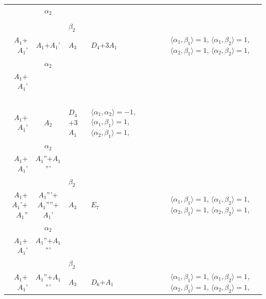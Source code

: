 \documentclass[12pt]{report}
\begin{document}
\begin{appendix}
{\begin{longtable}{rcl p{1cm}p{1cm}p{3cm} }
\\
\begin{tabular}{cc}$\alpha_1$+ & $\alpha_2$\\\tiny{  } & \tiny{  }\end{tabular} &\begin{tabular}{c} = \\~ \end{tabular} & \begin{tabular}{cc}$\beta_1$+ & $\beta_2$\\\tiny{ $A_1$+$A_1$' } & \tiny{ $A_1$+$A_1$' }\end{tabular} & $A_3$ & $D_4$+3$A_1$ &  $\langle\alpha_1, \beta_1\rangle=1$, $\langle\alpha_1, \beta_2\rangle=1$, $\langle\alpha_2, \beta_1\rangle=1$, $\langle\alpha_2, \beta_2\rangle=1$, 
\\
\begin{tabular}{cc}$\alpha_1$+ & $\alpha_2$\\\tiny{ $A_1$+$A_1$' } & \tiny{  }\end{tabular} &\begin{tabular}{c} = \\~ \end{tabular} & \begin{tabular}{c}$\beta_1$\\\tiny{ $A_1$+$A_1$' }\end{tabular} & $A_2$ & $D_4$+3$A_1$ & $\langle\alpha_1, \alpha_2\rangle=-1$,  $\langle\alpha_1, \beta_1\rangle=1$, $\langle\alpha_2, \beta_1\rangle=1$, 
\\
\begin{tabular}{cc}$\alpha_1$+ & $\alpha_2$\\\tiny{ $A_1$+$A_1$' } & \tiny{ $A_1$''+$A_1$''' }\end{tabular} &\begin{tabular}{c} = \\~ \end{tabular} & \begin{tabular}{cc}$\beta_1$+ & $\beta_2$\\\tiny{ $A_1$+$A_1$'+$A_1$'' } & \tiny{ $A_1$'''+$A_1$''''+$A_1$' }\end{tabular} & $A_3$ & $E_7$ &  $\langle\alpha_1, \beta_1\rangle=1$, $\langle\alpha_1, \beta_2\rangle=1$, $\langle\alpha_2, \beta_1\rangle=1$, $\langle\alpha_2, \beta_2\rangle=1$, 
\\
\begin{tabular}{cc}$\alpha_1$+ & $\alpha_2$\\\tiny{ $A_1$+$A_1$' } & \tiny{ $A_1$''+$A_1$''' }\end{tabular} &\begin{tabular}{c} = \\~ \end{tabular} & \begin{tabular}{cc}$\beta_1$+ & $\beta_2$\\\tiny{ $A_1$+$A_1$' } & \tiny{ $A_1$''+$A_1$''' }\end{tabular} & $A_3$ & $D_6$+$A_1$ &  $\langle\alpha_1, \beta_1\rangle=1$, $\langle\alpha_1, \beta_2\rangle=1$, $\langle\alpha_2, \beta_1\rangle=1$, $\langle\alpha_2, \beta_2\rangle=1$, 

\end{longtable}}
\end{appendix}
\end{document}

